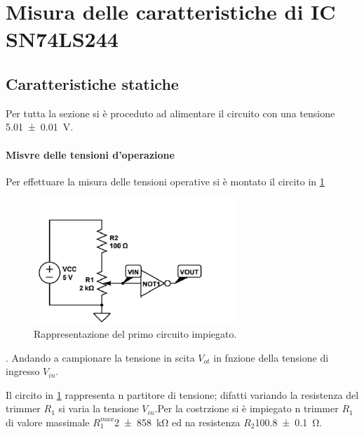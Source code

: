 \section{Misura delle caratteristiche di IC SN74LS244 }
\subsection{Caratteristiche statiche}
	Per tutta la sezione si è proceduto ad alimentare il circuito con una tensione 
	\SI{5.01 \pm 0.01}{\volt}.
	\paragraph{Misvre delle tensioni d'operazione}
	Per effettuare la misura delle tensioni operative si 
	è montato il circito in \figurename{ \ref{f:c1}}
		\begin{figure}[h]
			\includegraphics[scale=1.0]{immagine1.png}
			\caption{Rappresentazione del primo circuito impiegato.}
			\label{f:c1}
		\end{figure} .
	Andando a campionare la tensione in scita $V_{ot}$ in fnzione della tensione di ingresso  $V_{in}$.
	
	Il circito in  \figurename{ \ref{f:c1}} rappresenta n partitore di tensione;
		difatti variando la resistenza del trimmer $R_{1}$ si varia la tensione $V_{in}$.Per la costrzione si è impiegato n trimmer $R_{1}$ di valore massimale $R_{1}^{max}$\SI{2 \pm 858}{\kilo \ohm} ed na resistenza $R_{2}$\SI{100.8 \pm 0.1 }{ \ohm}.
		
